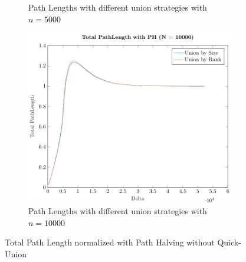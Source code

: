 \begin{figure}[ht]
\begin{subfigure}{0.32\textwidth}
        \caption{Path Lengths with different union strategies with $n = 5000$}
    \end{subfigure}%
    \hfill
    \begin{subfigure}{0.32\textwidth}
        \centering
        \includegraphics[width=\textwidth]{../images/plotPHNonFull10000_PathLength.pdf}
        \caption{Path Lengths with different union strategies with $n = 10000$}
    \end{subfigure}

    \caption{Total Path Length normalized with Path Halving without Quick-Union}
    \label{fig:tplPHNoQU}
\end{figure}


